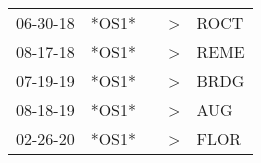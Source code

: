 \begin{supertabular}{p{0.07\textwidth}p{0.06\textwidth}p{0.02\textwidth}p{0.02\textwidth}p{0.06\textwidth}}
 06-30-18\textsuperscript{} &  *OS1* &   &  \textgreater &  ROCT\textsuperscript{} \\
 08-17-18\textsuperscript{} &  *OS1* &   &  \textgreater &  REME\textsuperscript{} \\
 07-19-19\textsuperscript{} &  *OS1* &   &  \textgreater &  BRDG\textsuperscript{} \\
 08-18-19\textsuperscript{} &  *OS1* &   &  \textgreater &   AUG\textsuperscript{} \\
 02-26-20\textsuperscript{} &  *OS1* &   &  \textgreater &  FLOR\textsuperscript{} \\
\end{supertabular}

